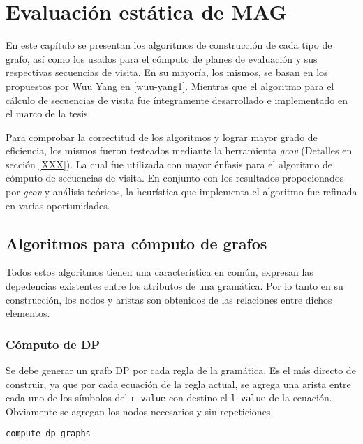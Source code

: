 \chapter{Evaluación estática de MAG}
\label{chap:eval_est}
\minitoc

En este capítulo se presentan los algoritmos de construcción de cada tipo de grafo, así como los usados para el cómputo de planes de evaluación y sus respectivas secuencias de visita. En su mayoría, los mismos, se basan en los propuestos por Wuu Yang en \ref{wuu-yang1}. Mientras que el algoritmo para el cálculo de secuencias de visita fue íntegramente desarrollado e implementado en el marco de la tesis.

Para comprobar la correctitud de los algoritmos y lograr mayor grado de eficiencia, los mismos fueron testeados mediante la herramienta \textit{gcov} (Detalles en sección \ref{XXX}). La cual fue utilizada con mayor énfasis para el algoritmo de cómputo de secuencias de visita. En conjunto con los resultados propocionados por \textit{gcov} y análisis teóricos, la heurística que implementa el algoritmo fue refinada en varias oportunidades.

\section{Algoritmos para cómputo de grafos}

Todos estos algoritmos tienen una característica en común, expresan las depedencias existentes entre los atributos de una gramática. Por lo tanto en su construcción, los nodos y aristas son obtenidos de las relaciones entre dichos elementos.

\subsection*{Cómputo de DP}

Se debe generar un grafo DP por cada regla de la gramática. Es el más directo de construir, ya que por cada ecuación de la regla actual, se agrega una arista entre cada uno de los símbolos del \texttt{r-value} con destino el \texttt{l-value} de la ecuación. Obviamente se agregan los nodos necesarios y sin repeticiones. 

\begin{algorithm}[H]

\caption{\texttt{compute\_dp\_graphs}}
\end{algorithm}

